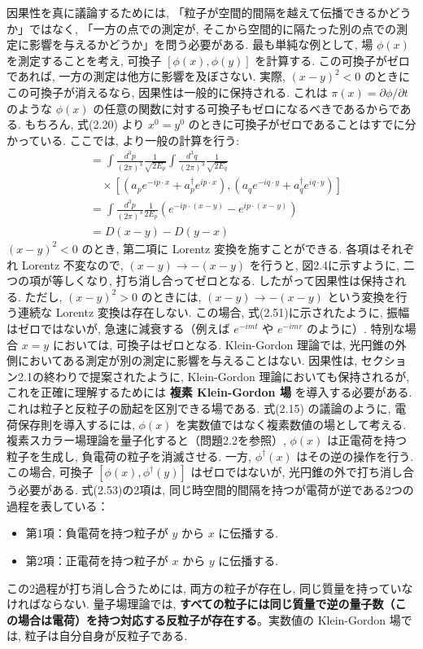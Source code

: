 \documentclass[a4paper,12pt]{article}
\begin{document}
因果性を真に議論するためには, 「粒子が空間的間隔を越えて伝播できるかどうか」ではなく, 「一方の点での測定が, そこから空間的に隔たった別の点での測定に影響を与えるかどうか」を問う必要がある. 最も単純な例として, 場 $\phi(x)$ を測定することを考え, 可換子 $[\phi(x), \phi(y)]$ を計算する. この可換子がゼロであれば, 一方の測定は他方に影響を及ぼさない. 実際, $(x - y)^2 < 0$ のときにこの可換子が消えるなら, 因果性は一般的に保持される. これは $\pi(x) = \partial \phi / \partial t$ のような $\phi(x)$ の任意の関数に対する可換子もゼロになるべきであるからである. もちろん, 式(2.20) より $x^0 = y^0$ のときに可換子がゼロであることはすでに分かっている. ここでは, より一般の計算を行う:
\begin{align*}
[\phi(x), \phi(y)] &= \int \frac{d^3 p}{(2\pi)^3} \frac{1}{\sqrt{2E_p}} \int \frac{d^3 q}{(2\pi)^3} \frac{1}{\sqrt{2E_q}} \\
&\quad \times \left[ \left( a_p e^{-ip \cdot x} + a_p^\dagger e^{ip \cdot x} \right), \left( a_q e^{-iq \cdot y} + a_q^\dagger e^{iq \cdot y} \right) \right] \nonumber \\
&= \int \frac{d^3 p}{(2\pi)^3} \frac{1}{2E_p} \left( e^{-ip \cdot (x - y)} - e^{ip \cdot (x - y)} \right) \\
&= D(x - y) - D(y - x) \tag{2.53}
\end{align*}
$(x - y)^2 < 0$ のとき, 第二項に Lorentz 変換を施すことができる. 各項はそれぞれ Lorentz 不変なので, $(x - y) \to -(x - y)$ を行うと, 図2.4に示すように, 二つの項が等しくなり, 打ち消し合ってゼロとなる. したがって因果性は保持される. ただし, $(x - y)^2 > 0$ のときには, $(x - y) \to -(x - y)$ という変換を行う連続な Lorentz 変換は存在しない. この場合, 式(2.51)に示されたように, 振幅はゼロではないが, 急速に減衰する（例えば $e^{-imt}$ や $e^{-imr}$ のように）. 特別な場合 $x = y$ においては, 可換子はゼロとなる. Klein-Gordon 理論では, 光円錐の外側においてある測定が別の測定に影響を与えることはない. 因果性は, セクション2.1の終わりで提案されたように, Klein-Gordon 理論においても保持されるが, これを正確に理解するためには \textbf{複素 Klein-Gordon 場} を導入する必要がある. これは粒子と反粒子の励起を区別できる場である. 式(2.15) の議論のように, 電荷保存則を導入するには, $\phi(x)$ を実数値ではなく複素数値の場として考える. 複素スカラー場理論を量子化すると（問題2.2を参照）, $\phi(x)$ は正電荷を持つ粒子を生成し, 負電荷の粒子を消滅させる. 一方, $\phi^\dagger(x)$ はその逆の操作を行う. この場合, 可換子 $[\phi(x), \phi^\dagger(y)]$ はゼロではないが, 光円錐の外で打ち消し合う必要がある. 式(2.53)の2項は, 同じ時空間的間隔を持つが電荷が逆である2つの過程を表している：
\begin{itemize}
\item 第1項：負電荷を持つ粒子が $y$ から $x$ に伝播する.
\item 第2項：正電荷を持つ粒子が $x$ から $y$ に伝播する.
\end{itemize}
この2過程が打ち消し合うためには, 両方の粒子が存在し, 同じ質量を持っていなければならない. 量子場理論では, \textbf{すべての粒子には同じ質量で逆の量子数（この場合は電荷）を持つ対応する反粒子が存在する}。実数値の Klein-Gordon 場では, 粒子は自分自身が反粒子である.
\end{document}
